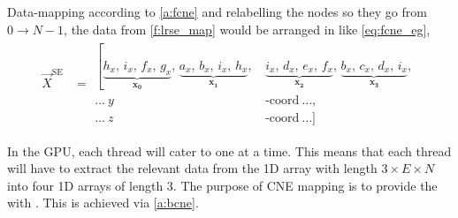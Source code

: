 Data-mapping according to \cref{a:fcne} and relabelling the nodes so they go from $ 0 \to N-1 $, the data from \cref{f:lrse_map} would be arranged in  like \cref{eq:fcne_eg},
\begin{align}\label{eq:fcne_eg}
	\vec{X}^{\textrm{SE}} & = \begin{aligned}
		\left[\underbrace{h_{x},\, i_{x},\, f_{x},\, g_{x}}_{\mathbf{x_{0}}},\,
		\underbrace{a_{x},\, b_{x},\, i_{x},\, h_{x}}_{\mathbf{x_{1}}},\,
		\right.  & \underbrace{i_{x},\, d_{x},\, e_{x},\, f_{x}}_{\mathbf{x_{2}}},\,
		\underbrace{b_{x},\, c_{x},\, d_{x},\, i_{x}}_{\mathbf{x_{3}}},              \\
		\ldots~y & \textrm{-coord}~\ldots,                                           \\
		\ldots~z & \textrm{-coord}~\ldots]
	\end{aligned}
\end{align}
%

In the GPU, each thread will cater to one  at a time. This means that each thread will have to extract the relevant data from the 1D array with length $ 3\times E\times N $ into four 1D arrays of length $ 3 $. The purpose of CNE mapping is to provide the  with . This is achieved via \cref{a:bcne}.


